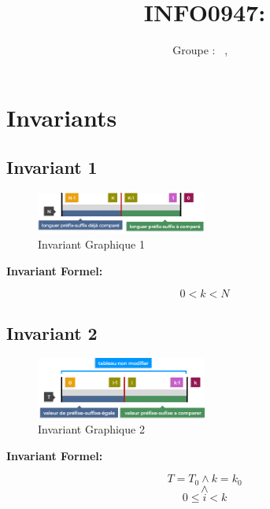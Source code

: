 \documentclass[a4paper, 11pt, oneside]{article}
\title{INFO0947: \intitule}
\author{Groupe \GrNbr : \PrenomUN~\textsc{\NomUN}, \PrenomDEUX~\textsc{\NomDEUX}}
\date{}
\begin{document}
\maketitle


\section{Invariants}

\subsection{Invariant 1}



\begin{figure}[h]
    \centering
    \includegraphics[width=0.5\textwidth]{inv1.png}
    \caption{Invariant Graphique 1}
\end{figure}

\textbf{Invariant Formel:}

\[ 0 < k < N \]

\subsection{Invariant 2}


\begin{figure}[h]
    \centering
    \includegraphics[width=0.5\textwidth]{invariant_T_2.png}
    \caption{Invariant Graphique 2}
\end{figure}

\textbf{Invariant Formel:}

\[ T = T_0 \land k = k_0 \]
\[ \land \]
\[ 0 \leq i < k \]






\end{document}
